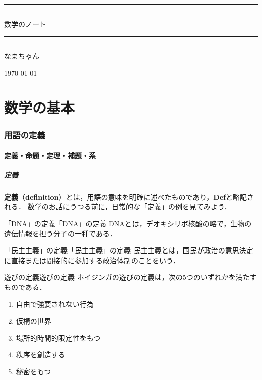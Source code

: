 \documentclass[a4paper,11pt]{ltjsarticle}
\renewcommand{\emph}[1]{\textbf{#1}}
\newcommand{\tituloum}[5]{
  \begin{titlepage}
    \begin{center}
        \pagecolor{white} %
        \color{mypurple} %
        
        \vspace*{2\baselineskip}
        
        \textcolor{mypurple}{\rule{\textwidth}{1.6pt}}\vspace*{-\baselineskip}\vspace*{2pt}
        \textcolor{mypurple}{\rule{\textwidth}{0.4pt}}
        
        \vspace{0.75\baselineskip}
        
        {\huge #1}
        
        \vspace{0.75\baselineskip}
        
        \textcolor{mypurple}{\rule{\textwidth}{0.4pt}}\vspace*{-\baselineskip}\vspace{3.2pt}
        \textcolor{mypurple}{\rule{\textwidth}{1.6pt}}
        
        \vspace{2\baselineskip}
        
        #3
        
        \vspace*{3\baselineskip}
        
        {\huge #2}
        
        \vspace{0.5\baselineskip}
        
        \textit{#4}
        
        \vfill
        
        \vspace{0.3\baselineskip}
        
        #5
        
    \end{center}
\end{titlepage}%
}
\begin{document}
\tituloum{数学のノート}{なまちゃん}{}{}{\today}

%

\thispagestyle{empty}

\newpage
{}
\pagecolor{white}

\localtableofcontents
\newpage 


\part*{数学の基本}
\section{用語の定義}

\subsection{定義・命題・定理・補題・系}

\subsubsection{定義}

\emph{定義}（\emph{definition}）とは，用語の意味を明確に述べたものであり，\textbf{Def}と略記される．
数学のお話にうつる前に，日常的な「定義」の例を見てみよう．

\begin{example}{「DNA」の定義}{「DNA」の定義}
DNAとは，デオキシリボ核酸の略で，生物の遺伝情報を担う分子の一種である．
\end{example}

\begin{example}{「民主主義」の定義}{「民主主義」の定義}
民主主義とは，国民が政治の意思決定に直接または間接的に参加する政治体制のことをいう．
\end{example}

\begin{example}{遊びの定義}{遊びの定義}
  ホイジンガの遊びの定義は，次の5つのいずれかを満たすものである．
  \begin{enumerate}[(1)]
    \item 自由で強要されない行為
    \item 仮構の世界
    \item 場所的時間的限定性をもつ
    \item 秩序を創造する
    \item 秘密をもつ
  \end{enumerate}
  \end{example}
\end{document}

